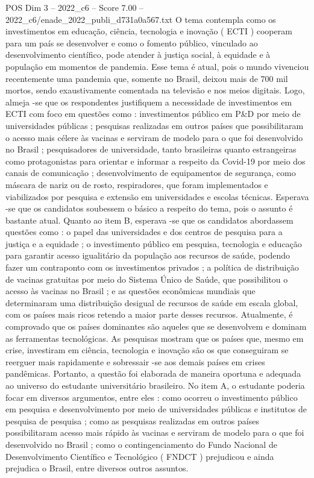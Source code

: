 \begin{textsample}{POS Dim 3 – 2022\_c6 – Score 7.00 – 2022\_c6/enade\_2022\_publi\_d731a0a567.txt}
O tema contempla como os investimentos em educação, ciência, tecnologia e inovação ( ECTI ) cooperam para um país se desenvolver e como o fomento público, vinculado ao desenvolvimento científico, pode atender à justiça social, à equidade e à população em momentos de pandemia.
Esse tema é atual, pois o mundo vivenciou recentemente uma pandemia que, somente no Brasil, deixou mais de 700 mil mortos, sendo exaustivamente comentada na televisão e nos meios digitais.
Logo, almeja -se que os respondentes justifiquem a necessidade de investimentos em ECTI com foco em questões como : investimentos público em P\&D por meio de universidades públicas ; pesquisas realizadas em outros países que possibilitaram o acesso mais célere às vacinas e serviram de modelo para o que foi desenvolvido no Brasil ; pesquisadores de universidade, tanto brasileiras quanto estrangeiras como protagonistas para orientar e informar a respeito da Covid-19 por meio dos canais de comunicação ; desenvolvimento de equipamentos de segurança, como máscara de nariz ou de rosto, respiradores, que foram implementados e viabilizados por pesquisa e extensão em universidades e escolas técnicas.
Esperava -se que os candidatos soubessem o básico a respeito do tema, pois o assunto é bastante atual.
Quanto ao item B, esperava -se que os candidatos abordassem questões como : o papel das universidades e dos centros de pesquisa para a justiça e a equidade ; o investimento público em pesquisa, tecnologia e educação para garantir acesso igualitário da população aos recursos de saúde, podendo fazer um contraponto com os investimentos privados ; a política de distribuição de vacinas gratuitas por meio do Sistema Único de Saúde, que possibilitou o acesso às vacinas no Brasil ; e as questões econômicas mundiais que determinaram uma distribuição desigual de recursos de saúde em escala global, com os países mais ricos retendo a maior parte desses recursos.
Atualmente, é comprovado que os países dominantes são aqueles que se desenvolvem e dominam as ferramentas tecnológicas.
As pesquisas mostram que os países que, mesmo em crise, investiram em ciência, tecnologia e inovação são os que conseguiram se reerguer mais rapidamente e sobressair -se aos demais países em crises pandêmicas.
Portanto, a questão foi elaborada de maneira oportuna e adequada ao universo do estudante universitário brasileiro.
No item A, o estudante poderia focar em diversos argumentos, entre eles : como ocorreu o investimento público em pesquisa e desenvolvimento por meio de universidades públicas e institutos de pesquisa de pesquisa ; como as pesquisas realizadas em outros países possibilitaram acesso mais rápido às vacinas e serviram de modelo para o que foi desenvolvido no Brasil ; como o contingenciamento do Fundo Nacional de Desenvolvimento Científico e Tecnológico ( FNDCT ) prejudicou e ainda prejudica o Brasil, entre diversos outros assuntos.

\end{textsample}
